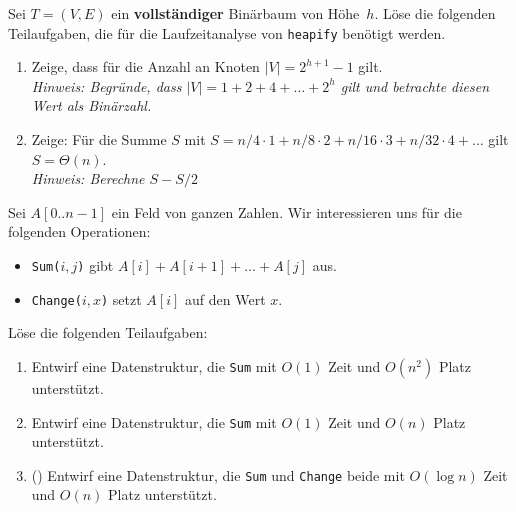 \documentclass{uebung_cs}
\begin{document}
\begin{aufgabe}
	Sei $T = (V,E)$ ein \textbf{vollständiger} Binärbaum von Höhe~$h$.
	Löse die folgenden Teilaufgaben, die für die Laufzeitanalyse von \texttt{heapify} benötigt werden.
	\begin{enumerate}
		\item Zeige, dass für die Anzahl an Knoten $|V| = 2^{h+1} - 1$ gilt.\\
		\textit{Hinweis: Begründe, dass $|V| = 1 + 2 + 4 + \hdots + 2^h$ gilt und betrachte diesen Wert als Binärzahl.}
		\item Zeige: Für die Summe $S$ mit $S = n / 4 \cdot 1 + n / 8 \cdot 2 + n / 16 \cdot 3 + n / 32 \cdot 4 + \hdots$ gilt $S = \Theta(n)$.\\
		\textit{Hinweis: Berechne $S - S/2$}
	\end{enumerate}
\end{aufgabe}


\begin{aufgabe}[Summen]
	Sei $A[0..n-1]$ ein Feld von ganzen Zahlen.
	Wir interessieren uns für die folgenden Operationen:
	\begin{itemize}
		\item \texttt{Sum($i,j$)} gibt $A[i] + A[i+1] + \hdots + A[j]$ aus.
		\item \texttt{Change($i,x$)} setzt $A[i]$ auf den Wert $x$.
	\end{itemize}
	Löse die folgenden Teilaufgaben:
	\begin{enumerate}
		\item \bestehen %
    Entwirf eine Datenstruktur, die \texttt{Sum} mit $O(1)$ Zeit und $O(n^2)$ Platz unterstützt.
		\item \mittel %
    Entwirf eine Datenstruktur, die \texttt{Sum} mit $O(1)$ Zeit und $O(n)$ Platz unterstützt.
		\item \note (\veryhard) Entwirf eine Datenstruktur, die \texttt{Sum} und \texttt{Change} beide mit $O(\log n)$ Zeit und $O(n)$ Platz unterstützt.
	\end{enumerate}
\end{aufgabe}
\end{document}
